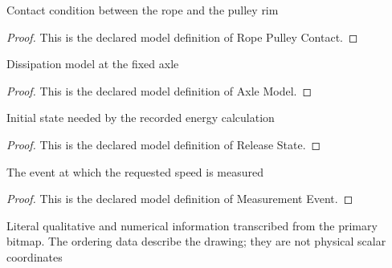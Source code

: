 \begin{definition}
  \label{def:physics:phyx-mini-0774:phyxminiproblems-problemphyxmini0774-ropepulleycontact}
  Contact condition between the rope and the pulley rim
\end{definition}
\begin{proof}
  This is the declared model definition of Rope Pulley Contact.
\end{proof}
\begin{definition}
  \label{def:physics:phyx-mini-0774:phyxminiproblems-problemphyxmini0774-axlemodel}
  Dissipation model at the fixed axle
\end{definition}
\begin{proof}
  This is the declared model definition of Axle Model.
\end{proof}
\begin{definition}
  \label{def:physics:phyx-mini-0774:phyxminiproblems-problemphyxmini0774-releasestate}
  Initial state needed by the recorded energy calculation
\end{definition}
\begin{proof}
  This is the declared model definition of Release State.
\end{proof}
\begin{definition}
  \label{def:physics:phyx-mini-0774:phyxminiproblems-problemphyxmini0774-measurementevent}
  The event at which the requested speed is measured
\end{definition}
\begin{proof}
  This is the declared model definition of Measurement Event.
\end{proof}
\begin{definition}
  \label{def:physics:phyx-mini-0774:phyxminiproblems-problemphyxmini0774-massivepulleyfigure}
  Literal qualitative and numerical information transcribed from the primary bitmap. The ordering data describe the drawing; they are not physical scalar coordinates
\end{definition}
